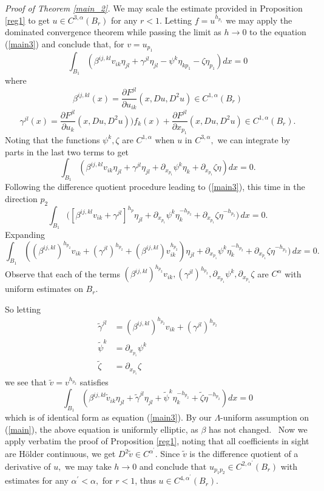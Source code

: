 \documentclass[12pt,leqno]{amsart}%
\theoremstyle{plain}
\numberwithin{equation}{section}
\theoremstyle{definition}
\begin{document}
\noindent\textit{Proof of Theorem \ref{main_2}.} We may scale the estimate
provided in Proposition \ref{reg1} to get $u\in C^{3,\alpha}(B_{r})$ for any
$r<1$. Letting $f=u^{h_{p_{1}}}$ we may apply the dominated convergence theorem while
passing the limit as $h\rightarrow0$ to the equation (\ref{main3}) and
conclude that, for $v=u_{p_{1}}$
\[
\int_{B_{1}}\left(  \beta^{ij,kl}v_{ik}\eta_{jl}+\gamma^{jl}\eta_{jl}-\psi
^{k}\eta_{kp_{1}}-\zeta\eta_{p_{1}}\right)  dx=0
\]
where
\[
\beta^{ij,kl}(x)=\frac{\partial F^{jl}}{\partial u_{ik}}(x,Du,D^{2}u)\in
C^{1,\alpha}(B_{r})
\]
\[
\gamma^{jl}(x)=\frac{\partial F^{jl}}{\partial u_{k}}(x,Du,D^{2}u))f_{k}(x)+\frac{\partial F^{jl}}{\partial x_{p_{1}}}(x,Du,D^{2}u)\in
C^{1,\alpha}(B_{r}).
\]
Noting that the functions $\psi^{k},\zeta$ are $C^{1,\alpha}$ when $u$ in
$C^{3,\alpha},$ we can integrate by parts in the last two terms to get
\[
\int_{B_{1}}\left(  \beta^{ij,kl}v_{ik}\eta_{jl}+\gamma^{jl}\eta_{jl}
+\partial_{x_{p_{1}}}\psi^{k}\eta_{k}+\partial_{x_{p_{1}}}\zeta\eta\right)
dx=0.
\]
Following the difference quotient procedure leading to (\ref{main3}), this
time in the direction $p_{2}$
\[
\int_{B_{1}}\bigg([\beta^{ij,kl}v_{ik}+\gamma^{jl}]^{h_{p}}\eta_{jl}+\partial_{x_{p_{1}}}\psi^{k}\eta_{k}^{-h_{p_{2}}}+\partial_{x_{p_{1}}}\zeta\eta^{-h_{p_{2}}}\bigg)\,dx=0.
\]
Expanding
\[
\int_{B_{1}} \left(  \left(  \beta^{ij,kl}\right)  ^{h_{p_{2}}}v_{ik}+\left(
\gamma^{jl}\right)  ^{h_{p_{2}}}+\left(  \beta^{ij,kl}\right)  v_{ik}^{h_{p_{2}}}\right)  \eta_{jl}+\partial_{x_{p_{1}}}\psi^{k}\eta_{k}^{-h_{p_{2}}}+\partial_{x_{p_{1}}}\zeta\eta^{-h_{p_{2}}}\bigg)\,dx=0.
\]
Observe that each of the terms $\left(  \beta^{ij,kl}\right)^{h_{p_{2}}}v_{ik},\left(  \gamma^{jl}\right)^{h_{p_{2}}},\partial_{x_{p_{1}}}\psi
^{k},\partial_{x_{p_{1}}}\zeta$ are $C^{\alpha}$ with uniform estimates on
$B_{r}.$

So letting
\begin{align*}
\tilde{\gamma}^{jl}  &  =\left(  \beta^{ij,kl}\right)  ^{h_{p_{2}}}v_{ik}+\left(  \gamma^{jl}\right)  ^{h_{p_{2}}}\\
\tilde{\psi}^{k}  &  =\partial_{x_{p_{1}}}\psi^{k}\\
\tilde{\zeta}  &  =\partial_{x_{p_{1}}}\zeta
\end{align*}
we see that $\tilde{v}=v^{h_{p_{2}}}$ satisfies
\begin{equation}
\int_{B_{1}}\left(  \beta^{ij,kl}\tilde{v}_{ik}\eta_{jl}+\tilde{\gamma}^{jl}\eta_{jl}+\tilde{\psi}^{k}\eta_{k}^{-h_{p_{2}}}+\tilde{\zeta}\eta^{-h_{p_{2}}}\right)  dx=0 \label{ummj}
\end{equation}
which is of identical form as equation (\ref{main3}). By our $\Lambda
$-uniform assumption on (\ref{main}), the above equation is uniformly
elliptic, as $\beta$ has not changed. \ Now we apply verbatim the proof of
Proposition \ref{reg1}, noting that all coefficients in sight are H\"{o}lder
continuous, we get $D^{2}\tilde{v}\in C^{\alpha^{\prime}}$. Since $\tilde{v}$
is the difference quotient of a derivative of $u,$ we may take $h\rightarrow0$
and conclude that $u_{p_{1} p_{2}}\in C^{2,\alpha^{\prime}}(B_{r})$ with
estimates for any $\alpha^{\prime}<\alpha,$ for $r<1$, thus $u\in
C^{4,\alpha^{\prime}}(B_{r}).$
\end{document}
